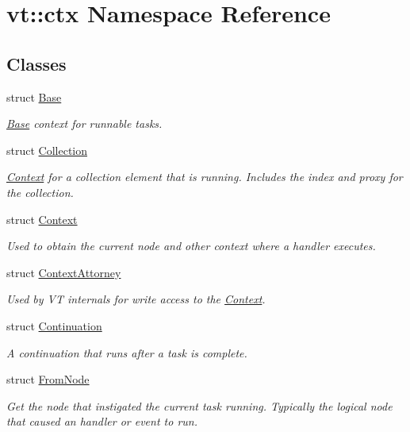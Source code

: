 \hypertarget{namespacevt_1_1ctx}{}\section{vt\+:\+:ctx Namespace Reference}
\label{namespacevt_1_1ctx}
\subsection*{Classes}
\begin{DoxyCompactItemize}
\item 
struct \hyperlink{structvt_1_1ctx_1_1_base}{Base}
\begin{DoxyCompactList}\small\item\em \hyperlink{structvt_1_1ctx_1_1_base}{Base} context for runnable tasks. \end{DoxyCompactList}\item 
struct \hyperlink{structvt_1_1ctx_1_1_collection}{Collection}
\begin{DoxyCompactList}\small\item\em \hyperlink{structvt_1_1ctx_1_1_context}{Context} for a collection element that is running. Includes the index and proxy for the collection. \end{DoxyCompactList}\item 
struct \hyperlink{structvt_1_1ctx_1_1_context}{Context}
\begin{DoxyCompactList}\small\item\em Used to obtain the current node and other context where a handler executes. \end{DoxyCompactList}\item 
struct \hyperlink{structvt_1_1ctx_1_1_context_attorney}{Context\+Attorney}
\begin{DoxyCompactList}\small\item\em Used by VT internals for write access to the \hyperlink{structvt_1_1ctx_1_1_context}{Context}. \end{DoxyCompactList}\item 
struct \hyperlink{structvt_1_1ctx_1_1_continuation}{Continuation}
\begin{DoxyCompactList}\small\item\em A continuation that runs after a task is complete. \end{DoxyCompactList}\item 
struct \hyperlink{structvt_1_1ctx_1_1_from_node}{From\+Node}
\begin{DoxyCompactList}\small\item\em Get the node that instigated the current task running. Typically the logical node that caused an handler or event to run. \end{DoxyCompactList}\item 

\end{DoxyCompactItemize}
